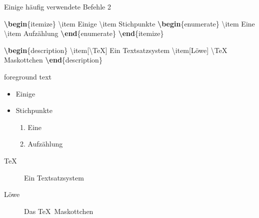 \documentclass[aspectratio=169]{beamer}
\newenvironment{Shaded}{\begin{snugshade}}{\end{snugshade}}
\newcommand{\ExtensionTok}[1]{\textcolor[rgb]{0.25,0.67,0.19}{#1}}
\newcommand{\FunctionTok}[1]{\textcolor[rgb]{0.34,0.51,0.35}{#1}}
\newcommand{\KeywordTok}[1]{\textcolor[rgb]{0.25,0.67,0.19}{\textbf{#1}}}
\newcommand{\NormalTok}[1]{\textcolor[rgb]{0.19,0.19,0.19}{#1}}
\newenvironment{Shaded}{}{}
\begin{document}
    \begin{frame}[fragile]{Einige häufig verwendete Befehle 2}
    \protect\hypertarget{einige-huxe4ufig-verwendete-befehle-2}{}
    \begin{minipage}{0.66\textwidth}

\begin{Shaded}
\begin{Highlighting}[]
\KeywordTok{\textbackslash{}begin}\NormalTok{\{}\ExtensionTok{itemize}\NormalTok{\}}
    \FunctionTok{\textbackslash{}item}\NormalTok{ Einige}
    \FunctionTok{\textbackslash{}item}\NormalTok{ Stichpunkte}
    \KeywordTok{\textbackslash{}begin}\NormalTok{\{}\ExtensionTok{enumerate}\NormalTok{\}}
        \FunctionTok{\textbackslash{}item}\NormalTok{ Eine}
        \FunctionTok{\textbackslash{}item}\NormalTok{ Aufzählung}
    \KeywordTok{\textbackslash{}end}\NormalTok{\{}\ExtensionTok{enumerate}\NormalTok{\}}
\KeywordTok{\textbackslash{}end}\NormalTok{\{}\ExtensionTok{itemize}\NormalTok{\}}

\KeywordTok{\textbackslash{}begin}\NormalTok{\{}\ExtensionTok{description}\NormalTok{\}}
    \FunctionTok{\textbackslash{}item}\NormalTok{[}\FunctionTok{\textbackslash{}TeX}\NormalTok{] Ein Textsatzsystem }
    \FunctionTok{\textbackslash{}item}\NormalTok{[Löwe] }\FunctionTok{\textbackslash{}TeX}\NormalTok{ Maskottchen }
\KeywordTok{\textbackslash{}end}\NormalTok{\{}\ExtensionTok{description}\NormalTok{\}}
\end{Highlighting}
\end{Shaded}

    \end{minipage}\begin{minipage}{0.33\textwidth}

    \bgroup 
        \begin{OutputBox}
        \begin{beamercolorbox}{foreground text}
            \selectfont%

    \begin{itemize}
        \item Einige
        \item Stichpunkte
        \begin{enumerate}
            \item Eine
            \item Aufzählung
        \end{enumerate}
    \end{itemize}

    \begin{description}
        \item[\TeX] Ein Textsatzsystem
        \item[Löwe] Das \TeX\ Maskottchen
    \end{description}

            \end{beamercolorbox}
        \end{OutputBox}
    \egroup

    \end{minipage}
    \end{frame}
\end{document}
